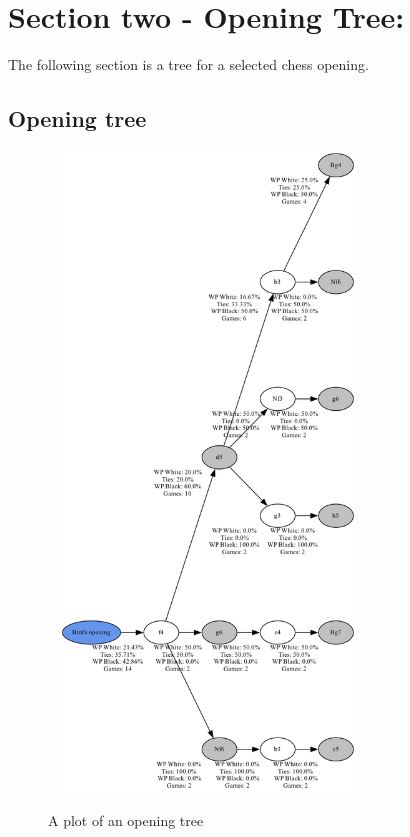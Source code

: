 \documentclass{article}%
\begin{document}
%
\section{Section two {-} Opening Tree:}%
\label{sec:Sectiontwo{-}OpeningTree}%
The following section is a tree for a selected chess opening.%
\subsection{Opening tree}%
\label{subsec:Openingtree}%


\begin{figure}[h!]%
\ \hspace*{-2cm}%
\centering%
\includegraphics[width=0.7\textwidth]{OpeningTree.png}%
\caption{A plot of an opening tree}%
\end{figure}

%
\end{document}
